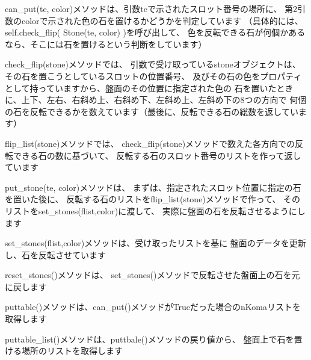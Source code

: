 \documentclass[uplatex,a4paper,11pt,oneside,openany]{jsbook}
\begin{document}
can\_put(te, color)メソッドは、引数teで示されたスロット番号の場所に、
第2引数のcolorで示された色の石を置けるかどうかを判定しています
（具体的には、self.check\_flip( Stone(te, color) )を呼び出して、
色を反転できる石が何個かあるなら、そこには石を置けるという判断をしています）

check\_flip(stone)メソッドでは、
引数で受け取っているstoneオブジェクトは、その石を置こうとしているスロットの位置番号、
及びその石の色をプロパティとして持っていますから、盤面のその位置に指定された色の
石を置いたときに、上下、左右、右斜め上、右斜め下、左斜め上、左斜め下の8つの方向で
何個の石を反転できるかを数えています（最後に、反転できる石の総数を返しています）

flip\_list(stone)メソッドでは、
check\_flip(stone)メソッドで数えた各方向での反転できる石の数に基づいて、
反転する石のスロット番号のリストを作って返しています

put\_stone(te, color)メソッドは、
まずは、指定されたスロット位置に指定の石を置いた後に、
反転する石のリストをflip\_list(stone)メソッドで作って、
そのリストをset\_stones(flist,color)に渡して、
実際に盤面の石を反転させるようにします

set\_stones(flist,color)メソッドは、受け取ったリストを基に
盤面のデータを更新し、石を反転させています

reset\_stones()メソッドは、
set\_stones()メソッドで反転させた盤面上の石を元に戻します

puttable()メソッドは、can\_put()メソッドがTrueだった場合のnKomaリストを取得します

puttable\_list()メソッドは、puttbale()メソッドの戻り値から、
盤面上で石を置ける場所のリストを取得します
\end{document}
